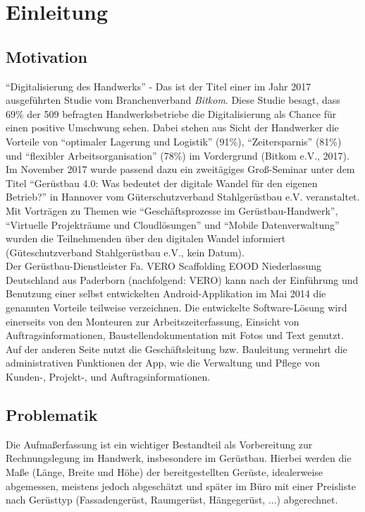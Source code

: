 \chapter{Einleitung}
\section{Motivation}
``Digitalisierung des Handwerks'' - Das ist der Titel einer im Jahr 2017 ausgeführten Studie vom Branchenverband \textit{Bitkom}. 
Diese Studie besagt, dass 69\% der 509 befragten Handwerksbetriebe die Digitalisierung als Chance für einen positive Umschwung sehen. 
Dabei stehen aus Sicht der Handwerker die Vorteile von ``optimaler Lagerung und Logistik'' (91\%), ``Zeitersparnis'' (81\%) und ``flexibler Arbeitsorganisation'' (78\%) im Vordergrund (Bitkom e.V., 2017). \\

Im November 2017 wurde passend dazu ein zweitägiges Groß-Seminar unter dem Titel ``Gerüstbau 4.0: Was bedeutet der digitale Wandel für den eigenen Betrieb?'' in Hannover vom Güterschutzverband Stahlgerüstbau e.V. veranstaltet. 
Mit Vorträgen zu Themen wie ``Geschäftsprozesse im Gerüstbau-Handwerk'', ``Virtuelle Projekträume und Cloudlösungen'' und ``Mobile Datenverwaltung'' wurden die Teilnehmenden über den digitalen Wandel informiert (Güteschutzverband Stahlgerüstbau e.V., kein Datum). \\

Der Gerüstbau-Dienstleister Fa. VERO Scaffolding EOOD Niederlassung Deutschland aus Paderborn (nachfolgend: \textsc{VERO}) kann nach der Einführung und Benutzung einer selbst entwickelten Android-Applikation im Mai 2014 die genannten Vorteile teilweise verzeichnen.
Die entwickelte Software-Lösung wird einerseits von den Monteuren zur Arbeitszeiterfassung, Einsicht von Auftragsinformationen, Baustellendokumentation mit Fotos und Text genutzt. Auf der anderen Seite nutzt die Geschäftsleitung bzw. Bauleitung vermehrt die administrativen Funktionen der App, wie die Verwaltung und Pflege von Kunden-, Projekt-, und Auftragsinformationen. \\


\section{Problematik}

Die Aufmaßerfassung ist ein wichtiger Bestandteil als Vorbereitung zur Rechnungslegung im Handwerk, insbesondere im Gerüstbau. Hierbei werden die Maße (Länge, Breite und Höhe) der bereitgestellten Gerüste, idealerweise abgemessen, meistens jedoch abgeschätzt und später im Büro mit einer Preisliste nach Gerüsttyp (Fassadengerüst, Raumgerüst, Hängegerüst, ...) abgerechnet. \\

